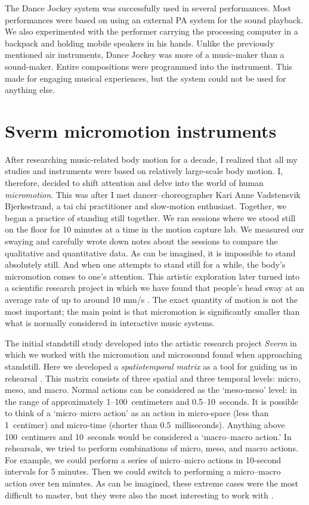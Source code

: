 The Dance Jockey system was successfully used in several performances. Most performances were based on using an external PA system for the sound playback. We also experimented with the performer carrying the processing computer in a backpack and holding mobile speakers in his hands. Unlike the previously mentioned air instruments, Dance Jockey was more of a music-maker than a sound-maker. Entire compositions were programmed into the instrument. This made for engaging musical experiences, but the system could not be used for anything else.


\section{Sverm micromotion instruments}\label{sec:sverm}

After researching music-related body motion for a decade, I realized that all my studies and instruments were based on relatively large-scale body motion. I, therefore, decided to shift attention and delve into the world of human \emph{micromotion}. This was after I met dancer--choreographer Kari Anne Vadstensvik Bjerkestrand, a tai chi practitioner and slow-motion enthusiast. Together, we began a practice of standing still together. We ran sessions where we stood still on the floor for 10 minutes at a time in the motion capture lab. We measured our swaying and carefully wrote down notes about the sessions to compare the qualitative and quantitative data. As can be imagined, it is impossible to stand absolutely still. And when one attempts to stand still for a while, the body's micromotion comes to one's attention. This artistic exploration later turned into a scientific research project in which we have found that people's head sway at an average rate of up to around 10 mm/s \citep{jensenius_musical_2017,gonzalez_sanchez_correspondences_2018,gonzalez_sanchez_analysis_2019,zelechowska_headphones_2020}. The exact quantity of motion is not the most important; the main point is that micromotion is significantly smaller than what is normally considered in interactive music systems.

The initial standstill study developed into the artistic research project \emph{Sverm}  in which we worked with the micromotion and microsound found when approaching standstill. Here we developed a \emph{spatiotemporal matrix} as a tool for guiding us in rehearsal \citep{lesaffre_sonic_2017}. This matrix consists of three spatial and three temporal levels: micro, meso, and macro. Normal actions can be considered as the `meso-meso' level: in the range of approximately 1--100~centimeters and 0.5--10~seconds. It is possible to think of a `micro--micro action' as an action in micro-space (less than 1~centimer) and micro-time (shorter than 0.5~milliseconds). Anything above 100~centimers and 10~seconds would be considered a `macro--macro action.' In rehearsals, we tried to perform combinations of micro, meso, and macro actions. For example, we could perform a series of micro--micro actions in 10-second intervals for 5 minutes. Then we could switch to performing a micro--macro action over ten minutes. As can be imagined, these extreme cases were the most difficult to master, but they were also the most interesting to work with \citep{jensenius_exploring_2012}.

